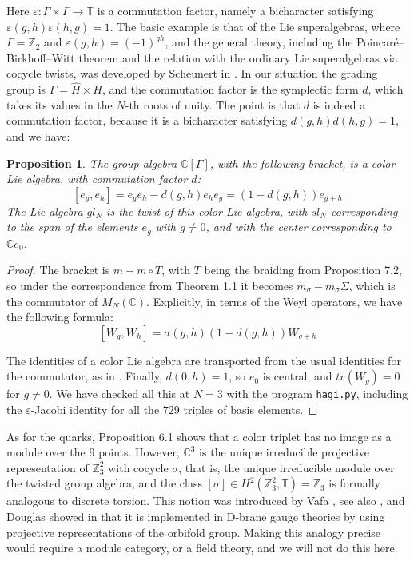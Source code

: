 \documentclass[11pt]{amsart}
\newtheorem{proposition}[theorem]{Proposition}
\theoremstyle{definition}
\begin{document}
Here $\varepsilon:\Gamma\times\Gamma\to\mathbb T$ is a commutation factor, namely a bicharacter satisfying $\varepsilon(g,h)\varepsilon(h,g)=1$. The basic example is that of the Lie superalgebras, where $\Gamma=\mathbb Z_2$ and $\varepsilon(g,h)=(-1)^{gh}$, and the general theory, including the Poincar\'e--Birkhoff--Witt theorem and the relation with the ordinary Lie superalgebras via cocycle twists, was developed by Scheunert in \cite{sch}. In our situation the grading group is $\Gamma=\widehat{H}\times H$, and the commutation factor is the symplectic form $d$, which takes its values in the $N$-th roots of unity. The point is that $d$ is indeed a commutation factor, because it is a bicharacter satisfying $d(g,h)d(h,g)=1$, and we have:

\begin{proposition}
The group algebra $\mathbb C[\Gamma]$, with the following bracket, is a color Lie algebra, with commutation factor $d$:
$$[e_g,e_h]=e_ge_h-d(g,h)e_he_g=(1-d(g,h))e_{g+h}$$
The Lie algebra $gl_N$ is the twist of this color Lie algebra, with $sl_N$ corresponding to the span of the elements $e_g$ with $g\neq0$, and with the center corresponding to $\mathbb Ce_0$.
\end{proposition}

\begin{proof}
The bracket is $m-m\circ T$, with $T$ being the braiding from Proposition 7.2, so under the correspondence from Theorem 1.1 it becomes $m_\sigma-m_\sigma\Sigma$, which is the commutator of $M_N(\mathbb C)$. Explicitly, in terms of the Weyl operators, we have the following formula:
$$[W_g,W_h]=\sigma(g,h)(1-d(g,h))W_{g+h}$$

The identities of a color Lie algebra are transported from the usual identities for the commutator, as in \cite{sch}. Finally, $d(0,h)=1$, so $e_0$ is central, and $tr(W_g)=0$ for $g\neq0$. We have checked all this at $N=3$ with the program {\tt hagi.py}, including the $\varepsilon$-Jacobi identity for all the $729$ triples of basis elements.
\end{proof}

As for the quarks, Proposition 6.1 shows that a color triplet has no image as a module over the $9$ points. However, $\mathbb C^3$ is the unique irreducible projective representation of $\mathbb Z_3^2$ with cocycle $\sigma$, that is, the unique irreducible module over the twisted group algebra, and the class $[\sigma]\in H^2(\mathbb Z_3^2,\mathbb T)=\mathbb Z_3$ is formally analogous to discrete torsion. This notion was introduced by Vafa \cite{vaf}, see also \cite{vwi}, and Douglas showed in \cite{dou} that it is implemented in D-brane gauge theories by using projective representations of the orbifold group. Making this analogy precise would require a module category, or a field theory, and we will not do this here.
\end{document}
